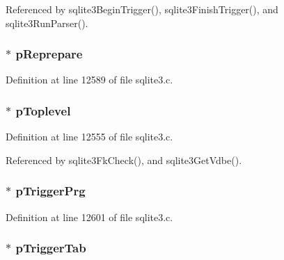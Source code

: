 Referenced by sqlite3\+Begin\+Trigger(), sqlite3\+Finish\+Trigger(), and sqlite3\+Run\+Parser().

\hypertarget{struct_parse_a0eb9386bc6675b699f91ebe6ba1ee13e}{}
\subsubsection[{p\+Reprepare}]{$\ast$ p\+Reprepare}\label{struct_parse_a0eb9386bc6675b699f91ebe6ba1ee13e}


Definition at line 12589 of file sqlite3.\+c.

\hypertarget{struct_parse_adb730f8e7fa964ef4dd94d64eaed12b6}{}
\subsubsection[{p\+Toplevel}]{$\ast$ p\+Toplevel}\label{struct_parse_adb730f8e7fa964ef4dd94d64eaed12b6}


Definition at line 12555 of file sqlite3.\+c.



Referenced by sqlite3\+Fk\+Check(), and sqlite3\+Get\+Vdbe().

\hypertarget{struct_parse_ae2902e8934695ce83b045eb613e58ea6}{}
\subsubsection[{p\+Trigger\+Prg}]{$\ast$ p\+Trigger\+Prg}\label{struct_parse_ae2902e8934695ce83b045eb613e58ea6}


Definition at line 12601 of file sqlite3.\+c.

\hypertarget{struct_parse_aef9d50c97b68250054207a21b19c6543}{}
\subsubsection[{p\+Trigger\+Tab}]{$\ast$ p\+Trigger\+Tab}\label{struct_parse_aef9d50c97b68250054207a21b19c6543}


